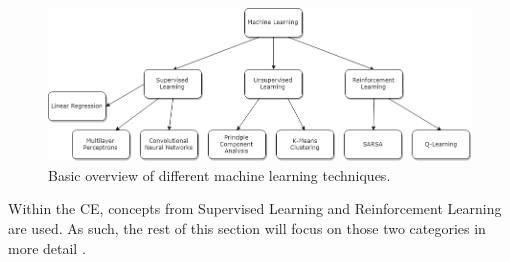 	\begin{figure}[ht]
		\centering
		\caption{Basic overview of different machine learning techniques.}
		\includegraphics[scale=0.5]{figures/MLdiagram.png}
	\end{figure}
	
	\par Within the CE, concepts from Supervised Learning and Reinforcement Learning are used. As such, the rest of this section will focus on those two categories in more detail \cite{placeholderCitation}. 

